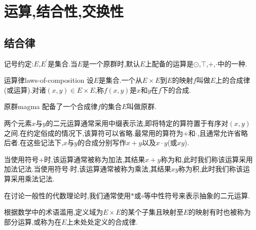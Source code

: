 \chapter{运算,结合性,交换性}

\section{结合律}

记号约定:$E$,$E^{\prime}$是集合.当$E$是一个原群时,默认$E$上配备的运算是$\odot$,$\top$,$+$,$\cdot$中的一种.

\begin{definition}{运算律}{laws-of-composition}
	设$E$是集合.一个从$E\times E$到$E$的映射$f$叫做$E$上的合成律(或运算).对诸$\left(x,y\right)\in E\times E$,称$f\left(x,y\right)$是$x$和$y$在$f$下的合成.
\end{definition}

\begin{definition}{原群}{magma}
	配备了一个合成律$f$的集合$E$叫做原群.
\end{definition}

两个元素$x$与$y$的二元运算通常采用中缀表示法,即将特定的算符置于有序对$\left(x,y\right)$之间.在约定俗成的情况下,该算符可以省略.最常用的算符为$+$和$\cdot$,且通常允许省略后者.在这些记法下,$x$与$y$的合成分别写作$x+y$以及$x\cdot y$(或$xy$).

当使用符号$+$时,该运算通常被称为加法,其结果$x+y$称为和,此时我们称该运算采用加法记法.当使用符号$\cdot$时,该运算通常被称为乘法,其结果$xy$称为积,此时我们称该运算采用乘法记法.

在讨论一般性的代数理论时,我们通常使用$\ast$或$\circ$等中性符号来表示抽象的二元运算.

根据数学中的术语滥用,定义域为$E\times E$的某个子集且映射至$E$的映射有时也被称为部分运算,或称为在$E$上未处处定义的合成律.

